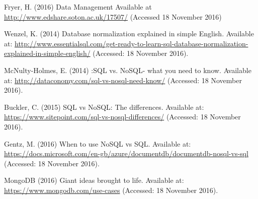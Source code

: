 \documentclass[8pt]{article}
\begin{document}
\newpage
\begin{thebibliography}{99}
 Fryer, H. (2016) Data Management Available at \url{http://www.edshare.soton.ac.uk/17507/} (Accessed 18 November 2016)

 Wenzel, K. (2014) Database normalization explained in simple English. Available at: \url{http://www.essentialsql.com/get-ready-to-learn-sql-database-normalization-explained-in-simple-english/} (Accessed: 18 November 2016).

 McNulty-Holmes, E. (2014) :SQL vs. NoSQL- what you need to know. Available at: \url{http://dataconomy.com/sql-vs-nosql-need-know/} (Accessed: 18 November 2016).

 Buckler, C. (2015) SQL vs NoSQL: The differences. Available at: \url{https://www.sitepoint.com/sql-vs-nosql-differences/} (Accessed: 18 November 2016).

 Gentz, M. (2016) When to use NoSQL vs SQL. Available at: \url{https://docs.microsoft.com/en-gb/azure/documentdb/documentdb-nosql-vs-sql} (Accessed: 18 November 2016).

 MongoDB (2016) Giant ideas brought to life. Available at: \url{https://www.mongodb.com/use-cases} (Accessed: 18 November 2016).
\end{thebibliography}
\end{document}
